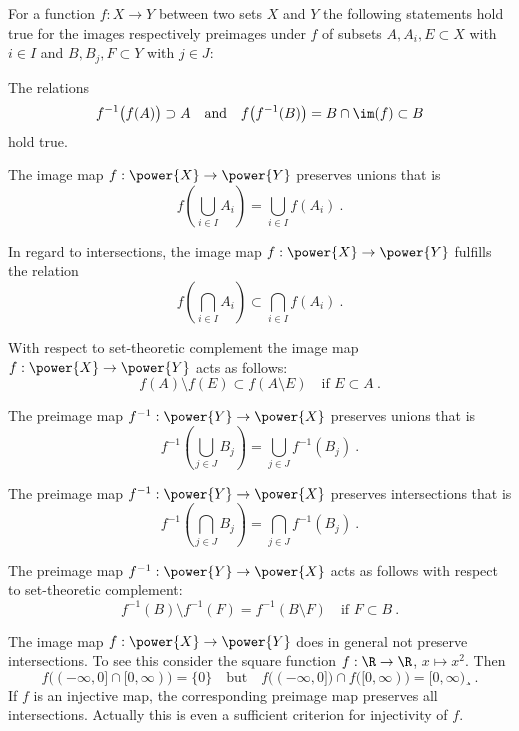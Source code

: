 \begin{proposition}
  For a function $f: X \to Y$ between two sets $X$ and $Y$ the following
  statements hold true for the images respectively preimages under $f$ of
  subsets $A, A_i, E \subset X$ with $i\in I$ and $B, B_j, F\subset Y$ with $j\in J$: 
  \begin{letterlist}
  \item
    The relations 
    \[
      f^{-1}\big( f (A)\big) \supset A  \quad \text{and} \quad
      f\big( f^{-1} (B)\big) = B \cap \im (f) \subset B 
    \]
    hold true.
  \item
    The image map $f : \power{X} \to \power{Y}$ preserves unions that is 
    \[
      f \left( \bigcup_{i\in I} A_i \right) = \bigcup_{i\in I} f (A_i) \ . 
    \]
  \item
    In regard to intersections, the image map $f : \power{X} \to \power{Y}$ 
    fulfills the relation
    \[
      f \left( \bigcap_{i\in I} A_i \right) \subset \bigcap_{i\in I} f (A_i) \ . 
    \]
  \item
    With respect to  set-theoretic complement 
    the image map  $f : \power{X} \to \power{Y}$ acts as follows:
    \[
      f (A) \setminus f(E) \subset f(A\setminus E) \quad \text{if } E \subset A \ . 
    \]
  \item 
    The preimage map $f^{-1}: \power{Y} \to \power{X}$ preserves unions that is 
    \[
      f^{-1}\left( \bigcup_{j\in J} B_j \right) = \bigcup_{j\in J} f^{-1} (B_j) \ .
    \] 
  \item 
    The preimage map $f^{-1}: \power{Y} \to \power{X}$ preserves intersections that is 
    \[
      f^{-1}\left( \bigcap_{j\in J} B_j \right) = \bigcap_{j\in J} f^{-1} (B_j) \ .
    \]     
  \item 
    The preimage map $f^{-1}: \power{Y} \to \power{X}$ acts as follows with respect to 
    set-theoretic complement:
    \[
      f^{-1} (B) \setminus f^{-1}(F ) =  f^{-1} (B\setminus F) \quad \text{if } F \subset B \ . 
    \]
  \end{letterlist}
\end{proposition}

\begin{remark}
   The image map $f : \power{X} \to \power{Y}$ does in general not preserve 
   intersections. To see this consider the square function
   $f: \R \to \R$, $x \mapsto x^2$. Then 
   \[
      f \big( (-\infty,0] \cap [0,\infty)\big) = \{ 0\}
      \quad \text{but} \quad  
      f \big( (-\infty,0]  \big) \cap  f \big( [0,\infty)\big) = 
      [0,\infty ) ¸\ . 
   \]
   If $f$ is an injective map, the corresponding preimage map preserves 
   all intersections. Actually this is even a sufficient criterion 
   for injectivity of $f$. 
 \end{remark}

